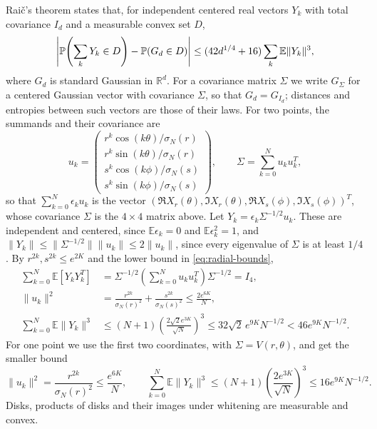 Rai\v{c}'s theorem \cite[Theorem 1.1]{Raic2019} states that, for
independent centered real vectors $Y_k$ with total covariance $I_d$ and a
measurable convex set $D$,
\[
 \left|\mathbb P\!\left(\sum_kY_k\in D\right)-\mathbb P(G_d\in D)\right|
 \le(42d^{1/4}+16)\sum_k\mathbb E\|Y_k\|^3,
\]
where $G_d$ is standard Gaussian in $\mathbb R^d$. For a covariance
matrix $\Sigma$ we write $G_\Sigma$ for a centered Gaussian vector with
covariance $\Sigma$, so that $G_d=G_{I_d}$; distances and entropies
between such vectors are those of their laws.
For two points, the summands and their covariance are
\[
 u_k=\begin{pmatrix}
 r^k\cos(k\theta)/\sigma_N(r)\\r^k\sin(k\theta)/\sigma_N(r)\\
 s^k\cos(k\phi)/\sigma_N(s)\\s^k\sin(k\phi)/\sigma_N(s)
 \end{pmatrix},\qquad
 \Sigma=\sum_{k=0}^Nu_ku_k^T,
\]
so that $\sum_{k=0}^N\epsilon_ku_k$ is the vector
$(\Re X_r(\theta),\Im X_r(\theta),\Re X_s(\phi),\Im X_s(\phi))^T$, whose
covariance $\Sigma$ is the $4\times4$ matrix above.
Let $Y_k=\epsilon_k\Sigma^{-1/2}u_k$. These are independent and centered,
since $\mathbb E\epsilon_k=0$ and $\mathbb E\epsilon_k^2=1$, and
$\|Y_k\|\le\|\Sigma^{-1/2}\|\|u_k\|\le2\|u_k\|$, since every eigenvalue of
$\Sigma$ is at least $1/4$. By $r^{2k},s^{2k}\le e^{2K}$ and the lower
bound in \eqref{eq:radial-bounds},
\begin{align*}
 \sum_{k=0}^N\mathbb E[Y_kY_k^T]
 &=\Sigma^{-1/2}\left(\sum_{k=0}^Nu_ku_k^T\right)\Sigma^{-1/2}
 =I_4,\\
 \|u_k\|^2
 &=\frac{r^{2k}}{\sigma_N(r)^2}+\frac{s^{2k}}{\sigma_N(s)^2}
 \le\frac{2e^{6K}}N,\\
 \sum_{k=0}^N\mathbb E\|Y_k\|^3
 &\le(N+1)\left(\frac{2\sqrt2e^{3K}}{\sqrt N}\right)^3
 \le32\sqrt2\,e^{9K}N^{-1/2}
 <46e^{9K}N^{-1/2}.
\end{align*}
For one point we use the first two coordinates, with
$\Sigma=V(r,\theta)$, and get the smaller bound
\[
 \|u_k\|^2=\frac{r^{2k}}{\sigma_N(r)^2}\le\frac{e^{6K}}N,\qquad
 \sum_{k=0}^N\mathbb E\|Y_k\|^3
 \le(N+1)\left(\frac{2e^{3K}}{\sqrt N}\right)^3
 \le16e^{9K}N^{-1/2}.
\]
Disks, products of disks and their images under whitening are
measurable and convex.

